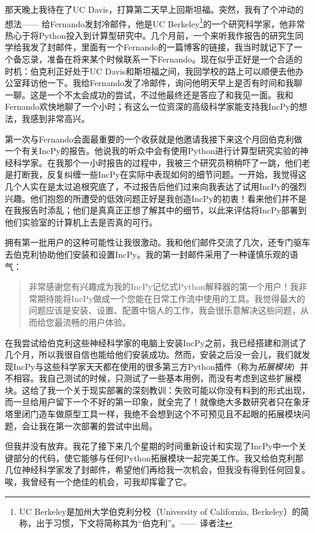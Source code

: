 \documentclass[letter,12pt]{book}
\begin{document}
\begin{CJK}{UTF8}{gbsn}
那天晚上我待在了UC Davis，打算第二天早上回斯坦福。突然，我有了个冲动的想法—— 给Fernando发封冷邮件，他是UC Berkeley\footnote{UC Berkeley是加州大学伯克利分校（University of California, Berkeley）的简称，出于习惯，下文将简称其为“伯克利”。—— 译者注}的一个研究科学家，他非常热心于将Python投入到计算型研究中。几个月前，一个来听我作报告的研究生同学给我发了封邮件，里面有一个Fernando的一篇博客的链接，我当时就记下了一个备忘录，准备在将来某个时候联系一下Fernando。现在似乎正好是一个合适的时机：伯克利正好处于UC Davis和斯坦福之间，我回学校的路上可以顺便去他办公室拜访他一下。我给Fernando发了冷邮件，询问他明天早上是否有时间和我聊一聊。这是一个不太会成功的尝试，不过他最终还是答应了和我见一面。我和Fernando欢快地聊了一个小时；有这么一位资深的高级科学家能支持我IncPy的想法，我感到非常高兴。

第一次与Fernando会面最重要的一个收获就是他邀请我接下来这个月回伯克利做一个有关IncPy的报告。他说我的听众中会有使用Python进行计算型研究实验的神经科学家。在我那个一小时报告的过程中，我被三个研究员稍稍吓了一跳，他们老是打断我，反复纠缠一些IncPy在实际中表现如何的细节问题。一开始，我觉得这几个人实在是太过追根究底了，不过报告后他们过来向我表达了试用IncPy的强烈兴趣。他们抱怨的所遭受的低效问题正好是我创造IncPy的初衷！看来他们并不是在我报告时添乱；他们是真真正正想了解其中的细节，以此来评估将IncPy部署到他们实验室的计算机上去是否真的可行。

拥有第一批用户的这种可能性让我很激动。我和他们邮件交流了几次，还专门驱车去伯克利协助他们安装和设置IncPy。我的第一封邮件采用了一种谨慎乐观的语气：
\begin{quote}
  非常感谢您有兴趣成为我的IncPy记忆式Python解释器的第一个用户！我非常期待能将IncPy做成一个您能在日常工作流中使用的工具。我觉得最大的问题应该是安装、设置、配置中恼人的工作，我会很乐意解决这些问题，从而给您最流畅的用户体验。
\end{quote}

在我尝试给伯克利这些神经科学家的电脑上安装IncPy之前，我已经搭建和测试了几个月，所以我很自信也能给他们安装成功。然而，安装之后没一会儿，我们就发现IncPy与这些科学家天天都在使用的很多第三方Python插件（称为\emph{拓展模块}）并不相容。我自己测试的时候，只测试了一些基本用例，而没有考虑到这些扩展模块。这给了我一个关于现实部署的深刻教训：失败可能以你没有料到的形式出现，而一旦给用户留下一个不好的第一印象，就全完了！就像绝大多数研究者只在象牙塔里闭门造车做原型工具一样，我绝不会想到这个不可预见且不起眼的拓展模块问题，会让我在第一次部署的尝试中出局。

但我并没有放弃。我花了接下来几个星期的时间重新设计和实现了IncPy中一个关键部分的代码，使它能够与任何Python拓展模块一起完美工作。我又给伯克利那几位神经科学家发了封邮件，希望他们再给我一次机会，但我没有得到任何回复。唉，我曾经有一个绝佳的机会，可我却挥霍了它。


\end{CJK}
\end{document}

